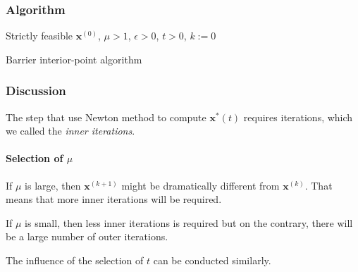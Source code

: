 \subsubsection{Algorithm}

\begin{algorithm}[H]
    \SetAlgoLined
     Strictly feasible $\mathbf{x}^{(0)}$, $\mu > 1$, $\epsilon > 0$,
     $t > 0$, $k:= 0$\;
     \caption{Barrier interior-point algorithm}
\end{algorithm}
\subsubsection{Discussion}
The step that use Newton method to compute $\mathbf{x}^*(t)$
requires iterations, which we called the \emph{inner iterations}.
\paragraph{Selection of $\mu$}
If $\mu$ is large, then $\mathbf{x}^{(k+1)}$ might
be dramatically different from $\mathbf{x}^{(k)}$.
That means that more inner iterations will be required.
\par
If $\mu$ is small, then less inner iterations is required
but on the contrary, there will be a large number of outer iterations.
\par
The influence of the selection of $t$ can be conducted similarly.

